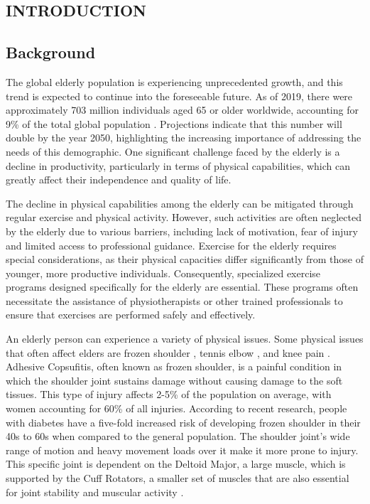 
\begin{spacing}{1.2}
	\chapter{INTRODUCTION}
\end{spacing}


\vspace{4ex}

\section{Background}
\label{sec1:Introduction}

The global elderly population is experiencing unprecedented growth, and this trend is expected to continue into the foreseeable future. As of 2019, there were approximately 703 million individuals aged 65 or older worldwide, accounting for 9\% of the total global population \cite{nations2019world}. Projections indicate that this number will double by the year 2050, highlighting the increasing importance of addressing the needs of this demographic. One significant challenge faced by the elderly is a decline in productivity, particularly in terms of physical capabilities, which can greatly affect their independence and quality of life.

The decline in physical capabilities among the elderly can be mitigated through regular exercise and physical activity. However, such activities are often neglected by the elderly due to various barriers, including lack of motivation, fear of injury and limited access to professional guidance. Exercise for the elderly requires special considerations, as their physical capacities differ significantly from those of younger, more productive individuals. Consequently, specialized exercise programs designed specifically for the elderly are essential. These programs often necessitate the assistance of physiotherapists or other trained professionals to ensure that exercises are performed safely and effectively.

An elderly person can experience a variety of physical issues. Some physical issues that often affect elders are frozen shoulder \cite{FrozShoulder5}, tennis elbow \cite{TennisElbow3}, and knee pain \cite{KneePain5}. Adhesive Copsufitis, often known as frozen shoulder, is a painful condition in which the shoulder joint sustains damage without causing damage to the soft tissues. This type of injury affects 2-5\% of the population on average, with women accounting for 60\% of all injuries. According to recent research, people with diabetes have a five-fold increased risk of developing frozen shoulder in their 40s to 60s when compared to the general population. The shoulder joint's wide range of motion and heavy movement loads over it make it more prone to injury. This specific joint is dependent on the Deltoid Major, a large muscle, which is supported by the Cuff Rotators, a smaller set of muscles that are also essential for joint stability and muscular activity \cite{FrozShoulder6}.


